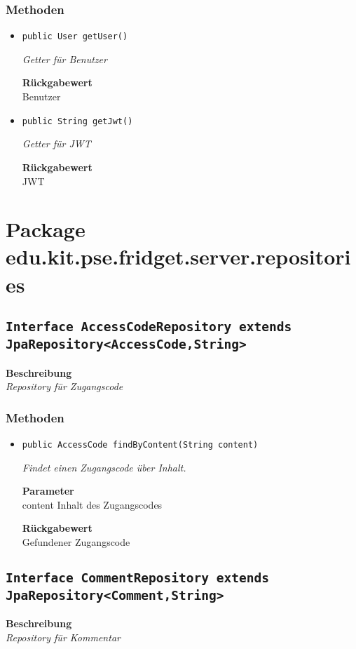     \subsubsection{Methoden}
    \begin{itemize}
    	\item{\texttt{public User getUser()}}
    	
    	\textit{Getter für Benutzer}
    	
    	
    	
    	\textbf{Rückgabewert} \\
    	Benutzer        \item{\texttt{public String getJwt()}}
    	
    	\textit{Getter für JWT}
    	
    	
    	
    	\textbf{Rückgabewert} \\
    	JWT
    \end{itemize}
    \section{Package edu.kit.pse.fridget.server.repositories}
    \subsection{\texttt{Interface AccessCodeRepository extends JpaRepository<AccessCode,String>}}
    \textbf{Beschreibung} \\
    \textit{Repository für Zugangscode}
    \subsubsection{Methoden}
    \begin{itemize}
    	\item{\texttt{public AccessCode findByContent(String content)}}
    	
    	\textit{Findet einen Zugangscode über Inhalt.}
    	
    	\textbf{Parameter} \\
    	content Inhalt des Zugangscodes
    	
    	\textbf{Rückgabewert} \\
    	Gefundener Zugangscode
    \end{itemize}
    \subsection{\texttt{Interface CommentRepository extends JpaRepository<Comment,String>}}
    \textbf{Beschreibung} \\
    \textit{Repository für Kommentar}
